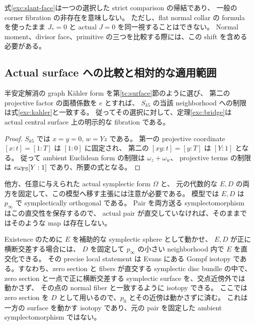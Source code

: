 式\eqref{exc:slant-face}は一つの選択した strict comparison の帰結であり、
一般の corner fibration の非存在を意味しない。
ただし、flat normal collar の formula を使ったまま $J_*=0$ と actual $J=0$ を同一視することはできない。
Normal moment、divisor face、primitive の三つを比較する際には、この shift を含める必要がある。

\subsection{Actual surface への比較と相対的な適用範囲}

\begin{corollary}
\label{exc:actual-graph}
半安定解消の graph K\"ahler form を第\ref{tc:surface}節のように選び、
第二の projective factor の面積係数を $e$ とすれば、
$S_{k5}$ の当該 neighborhood への制限は式\eqref{exc:kahler}と一致する。
従ってその選択に対して、定理\ref{exc:bridge}は actual central surface 上の明示的な fibration である。
\end{corollary}

\begin{proof}
$S_{k5}$ では $x=y=0$, $w=Yz$ である。
第一の projective coordinate $[x:t]=[1:T]$ は $[1:0]$ に固定され、
第二の $[xy:t]=[y:T]$ は $[Y:1]$ となる。
従って ambient Euclidean form の制限は $\omega_z+\omega_w$、
projective terms の制限は $e\omega_{\rm FS}[Y:1]$ であり、所要の式となる。
\end{proof}

他方、任意に与えられた actual symplectic form $\Omega$ と、
元の代数的な $E,D$ の両方を固定して、この模型へ移す主張には注意が必要である。
模型では $E,D$ は $p_\infty$ で symplectically orthogonal である。
Pair を両方送る symplectomorphism はこの直交性を保存するので、
actual pair が直交していなければ、そのままではそのような map は存在しない。

Existence のために $E$ を補助的な symplectic sphere として動かせ、
$E,D$ が正に横断交差する場合には、
$D$ を固定して $p_\infty$ の小さい neighborhood 内で $E$ を直交化できる。
その precise local statement は Evans \cite[\S5.2.1, Lemma 27]{evans-gompf} にある
Gompf isotopy である。すなわち、zero section と fibers が直交する symplectic disc bundle の中で、
zero section と一点で正に横断交差する symplectic surface を、交点近傍外では動かさず、
その点の normal fiber と一致するように isotopy できる。
ここでは zero section を $D$ として用いるので、$p_0$ とその近傍は動かさずに済む。
これは一方の surface を動かす isotopy であり、元の pair を固定した ambient symplectomorphism ではない。

